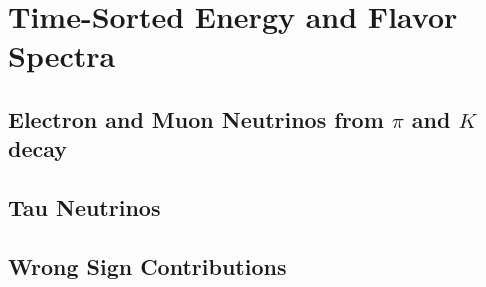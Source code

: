 %
%
\section{Time-Sorted Energy and Flavor Spectra}
\label{time_sorted_spectra}

\subsection{Electron and Muon Neutrinos from $\pi$ and $K$ decay}
\label{mu_e}

\subsection{Tau Neutrinos}
\label{taus}

\subsection{Wrong Sign Contributions}
\label{wrong_sign}


%
